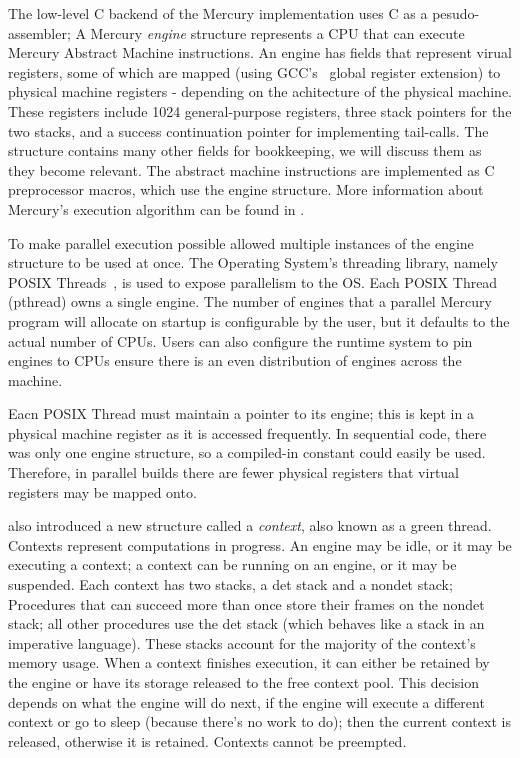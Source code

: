 

The low-level C backend of the Mercury implementation uses C as a
pesudo-assembler;
A Mercury \emph{engine} structure represents a CPU that can execute Mercury
Abstract Machine instructions.
An engine has fields that represent virual registers,
some of which are mapped (using GCC's~\citep{gcc} global register extension) to
physical machine registers - depending on the achitecture of the physical
machine.
These registers include 1024 general-purpose registers,
three stack pointers for the two stacks,
and a success continuation pointer for implementing tail-calls.
The structure contains many other fields for bookkeeping,
we will discuss them as they become relevant.
The abstract machine instructions are implemented as C preprocessor macros,
which use the engine structure.
More information about Mercury's execution algorithm can be found in
\citet{mercury_jlp}.

To make parallel execution possible \citet{conway:2002:par} allowed
multiple instances of the engine structure to be used at once.
The Operating System's threading library,
namely POSIX Threads~\citep{pthreads},
is used to expose parallelism to the OS.
Each POSIX Thread (pthread) owns a single engine.
The number of engines that a parallel Mercury program will allocate on startup
is configurable by the user,
but it defaults to the actual number of CPUs.
Users can also configure the runtime system to pin engines to CPUs
ensure there is an even distribution of engines across the machine.

Eacn POSIX Thread must maintain a pointer to its engine;
this is kept in a physical machine register as it is accessed
frequently.
In sequential code,
there was only one engine structure,
so a compiled-in constant could easily be used.
Therefore, in parallel builds there are fewer physical registers that
virtual registers may be mapped onto.

\citet{conway:2002:par} also introduced a new structure called a
\emph{context}, also known as a green thread.
Contexts represent computations in progress.
An engine may be idle, or it may be executing a context;
a context can be running on an engine, or it may be suspended.
Each context has two stacks, a det stack and a nondet stack;
Procedures that can succeed more than once
store their frames on the nondet stack;
all other procedures use the det stack
(which behaves like a stack in an imperative language).
These stacks account for the majority of the context's memory usage.
When a context finishes execution,
it can either be retained by the engine or have its storage released to the
free context pool.
This decision depends on what the engine will do next,
if the engine will execute a different context or go to sleep
(because there's no work to do);
then the current context is released,
otherwise it is retained.
Contexts cannot be preempted.

